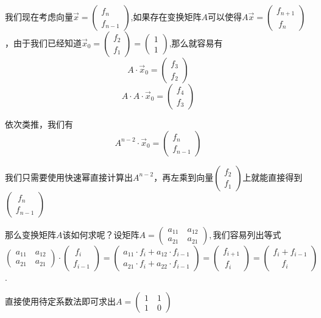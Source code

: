 \documentclass[UTF8]{article}
\begin{document}
我们现在考虑向量$\vec{x} = \left(
\begin{array}{l}
f_n \\ 
f_{n-1}
\end{array}
\right)$,如果存在变换矩阵$A$可以使得$A\vec{x} = \left(
\begin{array}{l}
f_{n+1} \\ 
\ f_{n}
\end{array}
\right)$，由于我们已经知道$\vec{x}_0 = \left(
\begin{array}{l}
f_2 \\ 
f_1
\end{array}
\right) = \left(
\begin{array}{l}
1 \\ 
1
\end{array}
\right)$,那么就容易有
$$A\cdot\vec{x}_0 = \left(
\begin{array}{l}
f_3 \\ 
f_2
\end{array}
\right)
$$
$$A\cdot A\cdot \vec{x}_0 = \left(
\begin{array}{l}
f_4 \\ 
f_3
\end{array}
\right)
$$


依次类推，我们有$$A^{n-2} \cdot \vec{x}_0 = \left(
\begin{array}{l}
f_n \\ 
f_{n-1}
\end{array}
\right)$$

我们只需要使用快速幂直接计算出$A^{n-2}$，再左乘到向量$\left(
\begin{array}{l}
f_2 \\ 
f_1
\end{array}
\right)$上就能直接得到$\left(
\begin{array}{l}
\ f_n \\ 
f_{n-1}
\end{array}
\right)$

那么变换矩阵$A$该如何求呢？设矩阵$A = \left(
\begin{array}{l}
a_{11} \quad a_{12}\\ 
a_{21} \quad a_{21}
\end{array}
\right),$我们容易列出等式
$$\left(
\begin{array}{l}
a_{11} \quad a_{12}\\ 
a_{21} \quad a_{21}
\end{array}
\right) \cdot \left(
\begin{array}{l}
\ f_i\\ 
f_{i-1}
\end{array}
\right) = \left(
\begin{array}{l}
a_{11}\cdot f_i + a_{12} \cdot f_{i-1}\\ 
a_{21}\cdot f_i + a_{22} \cdot f_{i-1}
\end{array}
\right) = \left(
\begin{array}{l}
f_{i+1}\\ 
\ f_i
\end{array}
\right) = \left(
\begin{array}{l}
f_i+ f_{i-1}\\ 
\quad f_i
\end{array}
\right)$$.



直接使用待定系数法即可求出$A = \left(
\begin{array}{l}
1 \quad 1\\ 
1 \quad 0
\end{array}
\right)$
\end{document}
